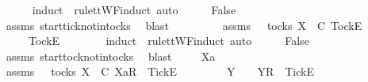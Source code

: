\ \ \ \ \isamarkupfalse%
\ {\isacharparenleft}induct\ {\isasymrho}\ rule{\isacharcolon}ttWF{\isachardot}induct{\isacharcomma}\ auto{\isacharparenright}\isanewline
\ \ \isamarkupfalse%
\ \isamarkupfalse%
\ False\isanewline
\ \ \ \ \isamarkupfalse%
\ assms{\isacharparenleft}{}{\isacharparenright}\ start{\isacharunderscore}tick{\isacharunderscore}notin{\isacharunderscore}tocks\ \isamarkupfalse%
\ blast\isanewline
{}\isamarkupfalse%
\isanewline
\ \ \isamarkupfalse%
\ {\isasymrho}\ {\isasymsigma}\isanewline
\ \ \isamarkupfalse%
\ assms{\isacharcolon}\ {\isachardoublequoteopen}{\isasymrho}\ {\isasymin}\ tocks\ X{\isachardoublequoteclose}\ {\isachardoublequoteopen}{\isasymrho}\ {\isasymsubseteq}\isactrlsub C\ {\isacharbrackleft}Tock{\isacharbrackright}\isactrlsub E\ {\isacharhash}\ {\isasymsigma}{\isachardoublequoteclose}\isanewline
\ \ \isamarkupfalse%
\ \isamarkupfalse%
\ {\isasymrho}{\isacharprime}\ \ {\isachardoublequoteopen}{\isasymrho}\ {\isacharequal}\ {\isacharbrackleft}Tock{\isacharbrackright}\isactrlsub E\ {\isacharhash}\ {\isasymrho}{\isacharprime}{\isachardoublequoteclose}\isanewline
\ \ \ \ \isamarkupfalse%
\ {\isacharparenleft}induct\ {\isasymrho}\ rule{\isacharcolon}ttWF{\isachardot}induct{\isacharcomma}\ auto{\isacharparenright}\isanewline
\ \ \isamarkupfalse%
\ \isamarkupfalse%
\ False\isanewline
\ \ \ \ \isamarkupfalse%
\ assms{\isacharparenleft}{}{\isacharparenright}\ start{\isacharunderscore}tock{\isacharunderscore}notin{\isacharunderscore}tocks\ \isamarkupfalse%
\ blast\isanewline
{}\isamarkupfalse%
\isanewline
\ \ \isamarkupfalse%
\ {\isasymrho}\ Xa\ {\isasymsigma}\isanewline
\ \ \isamarkupfalse%
\ assms{\isacharcolon}\ {\isachardoublequoteopen}{\isasymrho}\ {\isasymin}\ tocks\ X{\isachardoublequoteclose}\ {\isachardoublequoteopen}{\isasymrho}\ {\isasymsubseteq}\isactrlsub C\ {\isacharbrackleft}Xa{\isacharbrackright}\isactrlsub R\ {\isacharhash}\ {\isacharbrackleft}Tick{\isacharbrackright}\isactrlsub E\ {\isacharhash}\ {\isasymsigma}{\isachardoublequoteclose}\isanewline
\ \ \isamarkupfalse%
\ \isamarkupfalse%
\ {\isasymrho}{\isacharprime}\ Y\ \ {\isachardoublequoteopen}{\isasymrho}\ {\isacharequal}\ {\isacharbrackleft}Y{\isacharbrackright}\isactrlsub R\ {\isacharhash}\ {\isacharbrackleft}Tick{\isacharbrackright}\isactrlsub E\ {\isacharhash}\ {\isasymrho}{\isacharprime}{\isachardoublequoteclose}\isanewline
